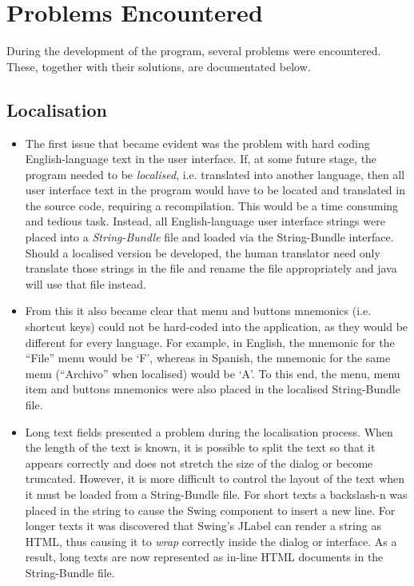 \section{Problems Encountered}

During the development of the program, several problems were encountered.
These, together with their solutions, are documentated below.

\label{problems}

\subsection{Localisation}

\begin{itemize}

\item The first issue that became evident was the problem with hard coding
English-language text in the user interface. If, at some future stage, the
program needed to be \emph{localised}, i.e. translated into another language,
then all user interface text in the program would have to be located and
translated in the source code, requiring a recompilation. This would be a time
consuming and tedious task. Instead, all English-language user interface
strings were placed into a \emph{String-Bundle} file and loaded via the
String-Bundle interface. Should a localised version be developed, the human
translator need only translate those strings in the file and rename the file
appropriately and java will use that file instead.

\item From this it also became clear that menu and buttons mnemonics (i.e. 
shortcut keys) could not be hard-coded into the application, as they would 
be different for every language. For example, in English, the mnemonic
for the ``File'' menu would be `F', whereas in Spanish, the mnemonic for
the same menu (``Archivo'' when localised) would be `A'. To this end, the
menu, menu item and buttons mnemonics were also placed in the localised
String-Bundle file.

\item Long text fields presented a problem during the localisation process.
When the length of the text is known, it is possible to split the text so that
it appears correctly and does not stretch the size of the dialog or become
truncated. However, it is more difficult to control the layout of the text when
it must be loaded from a String-Bundle file. For short texts a backslash-n was placed
in the string to cause the Swing component to insert a new line. For longer
texts it was discovered that Swing's JLabel can render a string as HTML, thus
causing it to \emph{wrap} correctly inside the dialog or interface. As a
result, long texts are now represented as in-line HTML documents in the
String-Bundle file.


\end{itemize}

